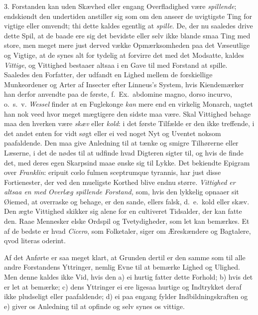 \documentclass[12pt,a4paper]{article}
\newcommand{\opage}[1]{\marginnote{\footnotesize\textit{[#1]}}}
\begin{document}
3. Forstanden kan uden Skævhed eller engang Overfladighed være \emph{spillende};
endskiøndt den undertiden anstiller sig som om den anseer de uvigtigste Ting for vigtige
eller omvendt; thi dette kaldes egentlig at \emph{spille}. De, der nu saaledes drive dette
Spil, at de baade ere sig det bevidste eller selv ikke blande smaa Ting med store, men
meget mere just derved vække Opmærksomheden paa det Væseutlige og Vigtige, at de synes alt
for tydelig at forvirre det med det Modsatte, kaldes \emph{Vittige}, og Vittighed bestaaer
altsaa i en Gave til med Forstand at spille. Saaledes den Forfatter, der udfandt en Lighed
mellem de forskiellige Munkeordener og Arter af Insecter efter Linneus's System, hvis
Kiendemærker han derfor anvendte paa de første, f.~Ex.\ abdomine magno, dorso incurvo,
o.~s.~v. \emph{Wessel} finder at en Fuglekonge \emph{kan} mere end en virkelig Monarch,
uagtet han nok veed hvor meget mægtigere den sidste maa være. Skal Vittighed behage maa
den hverken være \emph{skæv} eller \emph{kold}: i det første Tilfælde er den ikke
treffende, i det andet enten for vidt søgt eller ei ved noget Nyt og Uventet noksom
paafaldende. Den maa give Anledning til
\opage{155} at tænke og smigre Tilhørerne eller Læserne, i det de nødes til at udfinde hvad Digteren
sigter til, og hvis de finde det, med deres egen Skarpsind maae ønske sig til Lykke. Det
bekiendte Epigram over \emph{Franklin}: eripuit c\oe{}lo fulmen sceptrumque tyrannis, har
just disse Fortienester, der ved den mueligste Korthed blive endnu større.
\emph{Vittighed er altsaa en med Overlæg spillende Forstand,} som, hvis den lykkelig
opnaaer sit Øiemed, at overraske og behage, er den sande, ellers falsk, d.~e.\ kold eller
skæv. Den ægte Vittighed skikker sig alene for en cultiveret Tidsalder, der kan fatte den.
Raae Mennesker elske Ordspil og Tvetydigheder, som let kan bemærkes. Et af de bedste er
hvad \emph{Cicero}, som Folketaler, siger om Æreskændere og Bagtalere, qvod literas
oderint.

Af det Anførte er saa meget klart, at Grunden dertil er den samme som til alle andre
Forstandens Yttringer, nemlig Evne til at bemærke Lighed og Ulighed. Men denne kaldes ikke
Vid, hvis den a) ei hurtig fatter dette Forhold; b) hvis det er let at bemærke; c) dens
Yttringer ei ere ligesaa hurtige og Indtrykket deraf ikke pludseligt eller paafaldende;
d) ei paa engang fylder Indbildningskraften og e) giver os Anledning til at opfinde og
selv synes os vittige.
\end{document}
